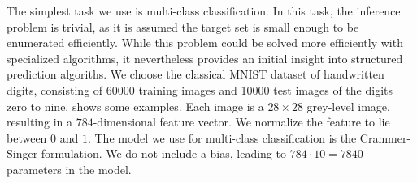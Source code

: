 The simplest task we use is multi-class classification. In this task,
the inference problem is trivial, as it is assumed the target set is small enough
to be enumerated efficiently. While this problem could be solved more efficiently
with specialized algorithms, it nevertheless provides an initial insight into structured
prediction algoriths.
We choose the classical MNIST dataset of handwritten digits, consisting of
60000 training images and 10000 test images of the digits zero to nine.
 shows some examples. Each image is a $28 \times 28$
grey-level image, resulting in a $784$-dimensional feature vector. We normalize
the feature to lie between $0$ and $1$.
%
\enlargethispage{15mm}
The model we use for multi-class classification is the Crammer-Singer
formulation. We do not include a bias, leading to $784 \cdot 10 = 7840$
parameters in the model.


